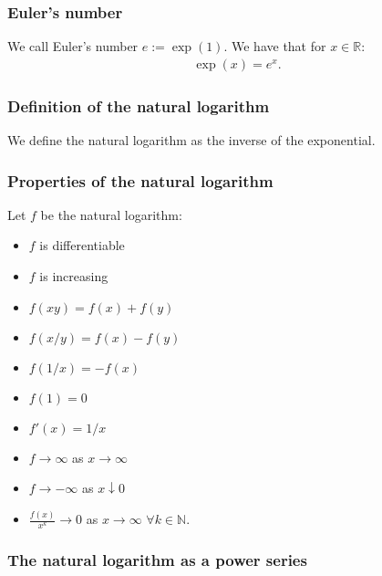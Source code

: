 \documentclass[a4paper, 12pt, twoside]{article}
\begin{document}
\subsubsection{Euler's number}

We call Euler's number $e := \exp(1)$. We have that for $x \in \mathbb{R}$:
\begin{align*}
      \exp(x) = e^x.
\end{align*}

\subsubsection{Definition of the natural logarithm}

We define the natural logarithm as the inverse of the exponential.

\subsubsection{Properties of the natural logarithm}

Let $f$ be the natural logarithm:

\begin{multicols}{2}
      \begin{itemize}
            \item $f$ is differentiable
            \item $f$ is increasing
            \item $f(xy) = f(x) + f(y)$
            \item $f(x / y) = f(x) - f(y)$
            \item $f(1/x) = -f(x)$
      \end{itemize}
      \columnbreak
      \begin{itemize}
            \item $f(1) = 0$
            \item $f'(x) = 1/x$
            \item $f \to \infty$ as $x \to \infty$
            \item $f \to -\infty$ as $x \downarrow 0$
            \item $\frac{f(x)}{x^k} \to 0$ as 
                  $x \to \infty$ $\forall k \in \mathbb{N}$.
      \end{itemize}
\end{multicols}

\subsubsection{The natural logarithm as a power series}
\end{document}
